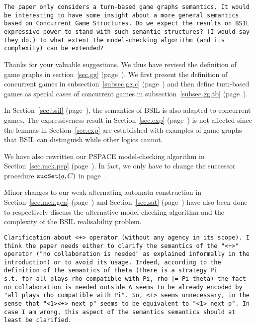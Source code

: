 \documentclass[11pt]{article}
\newcommand{\ttsynsuc}{\mbox{\tt sucSet}}
\newcounter{cabbage1}
\newcounter{cabbage2}
\newcounter{cabbage3}
\newcounter{bean1}
\newcounter{bean2}
\newcounter{bean3}
\newcounter{bean4}
\newcounter{bean5}
\newcounter{bean6}
\newenvironment{reply1}{\begin{list}{\bf (Reply 1.\arabic{bean1}):} 
        {\usecounter{bean1}\setcounter{bean1}{\value{cabbage1}} \item \setcounter{cabbage1}{\value{bean1}} 
        }
}{\end{list}}
\begin{document}
\begin{verbatim} 
The paper only considers a turn-based game graphs semantics. It would 
be interesting to have some insight about a more general semantics 
based on Concurrent Game Structures. Do we expect the results on BSIL 
expressive power to stand with such semantic structures? (I would say 
they do.) To what extent the model-checking algorithm (and its 
complexity) can be extended? 
\end{verbatim} 
\begin{reply1} 
Thanks for your valuable suggestions. 
We thus have revised the definition of game graphs in 
section~\ref{sec.gg} (page~\pageref{sec.gg}).  
We first present the definition of concurrent games 
in subsection~\ref{subsec.gg.c}  (page~\pageref{subsec.gg.c})
and then define turn-based games as special cases of concurrent games 
in subsection~\ref{subsec.gg.tb} (page~\pageref{subsec.gg.tb}).  

In Section~\ref{sec.bsil} (page~\pageref{sec.bsil}), 
the semantics of BSIL is also adapted to concurrent games.   
The expressiveness result in Section~\ref{sec.exp} (page~\pageref{sec.exp}) is not affected 
since the lemmas in Section~\ref{sec.exp} are established 
with examples of game graphs that BSIL can distinguish while 
other logics cannot. 

We have also rewritten our PSPACE model-checking algorithm 
in Section~\ref{sec.mck.psp} (page~\pageref{sec.mck.psp}). 
In fact, we only have to change the successor procedure 
$\ttsynsuc(q,C)$ in 
page~\pageref{tab.nd.suc}.  

Minor changes to our weak alternating automata construction 
in Section~\ref{sec.mck.gen} (page~\pageref{sec.mck.gen}) and 
Section~\ref{sec.sat} (page~\pageref{sec.sat})
have also been done 
to respectively discuss the alternative model-checking algorithm 
and the complexity of the BSIL realisability problem.  
\end{reply1} 
\begin{verbatim} 
Clarification about <+> operator (without any agency in its scope). I 
think the paper needs either to clarify the semantics of the "<+>" 
operator ("no collaboration is needed" as explained informally in the 
introduction) or to avoid its usage. Indeed, according to the 
definition of the semantics of theta (there is a strategy Pi 
s.t. for all plays rho compatible with Pi, rho |=_Pi theta) the fact 
no collaboration is needed outside A seems to be already encoded by 
"all plays rho compatible with Pi". So, <+> seems unnecessary, in the 
sense that "<1><+> next p" seems to be equivalent to "<1> next p". In 
case I am wrong, this aspect of the semantics semantics should at 
least be clarified. 
\end{verbatim} 
\end{document}
